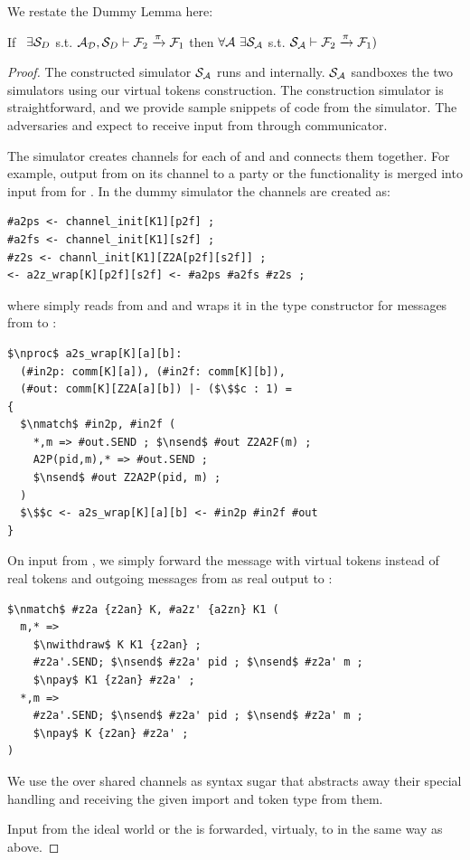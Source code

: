 We restate the Dummy Lemma here:
\begin{theorem}\label{thm:dummy}
If \ $\exists \mathcal{S}_{D}$ s.t. $ \mathcal{A}_\mathcal{D}, \mathcal{S}_{D} \vdash \mathcal{F}_2 \xrightarrow{\pi} \mathcal{F}_1$ then $\forall \mathcal{A} \ \exists \mathcal{S}_\mathcal{A}$ s.t. $\mathcal{S}_{\mathcal{A}} \vdash  \mathcal{F}_2 \xrightarrow{\pi} \mathcal{F}_1)$ 
\end{theorem}

\begin{proof}
The constructed simulator $\mathcal{S}_\mathcal{A}$ runs \A and \DS internally.
$\mathcal{S}_\mathcal{A}$ sandboxes the two simulators using our virtual tokens construction.
The construction simulator is straightforward, and we provide sample snippets of code from the simulator.
The adversaries \A and \DS expect to receive input from \Z through communicator.

The simulator creates channels for each of \A and \DS and connects them together.
For example, output from \A on its channel to a party or the functionality is merged 
into input from \Z for \DS.
In the dummy simulator the channels are created as:
\begin{lstlisting}[basicstyle=\footnotesize\BeraMonottFamily, frame=single,  mathescape]
#a2ps <- channel_init[K1][p2f] ;
#a2fs <- channel_init[K1][s2f] ;
#z2s <- channl_init[K1][Z2A[p2f][s2f]] ;
<- a2z_wrap[K][p2f][s2f] <- #a2ps #a2fs #z2s ;
\end{lstlisting}
where  simply reads from  and  and wraps it in the type constructor for messages from \Z to \A:
\begin{lstlisting}[basicstyle=\footnotesize\BeraMonottFamily, frame=single,  mathescape]
$\nproc$ a2s_wrap[K][a][b]:
  (#in2p: comm[K][a]), (#in2f: comm[K][b]), 
  (#out: comm[K][Z2A[a][b]) |- ($\$$c : 1) =
{
  $\nmatch$ #in2p, #in2f (
    *,m => #out.SEND ; $\nsend$ #out Z2A2F(m) ;
    A2P(pid,m),* => #out.SEND ; 
    $\nsend$ #out Z2A2P(pid, m) ;
  )
  $\$$c <- a2s_wrap[K][a][b] <- #in2p #in2f #out 
}
\end{lstlisting}

On input from \Z, we simply forward the message with virtual tokens instead of real tokens and outgoing messages from \A as real output to \Z:
\begin{lstlisting}[basicstyle=\footnotesize\BeraMonottFamily, frame=single,  mathescape]
$\nmatch$ #z2a {z2an} K, #a2z' {a2zn} K1 (
  m,* =>
    $\nwithdraw$ K K1 {z2an} ;
    #z2a'.SEND; $\nsend$ #z2a' pid ; $\nsend$ #z2a' m ;
    $\npay$ K1 {z2an} #z2a' ;
  *,m =>
    #z2a'.SEND; $\nsend$ #z2a' pid ; $\nsend$ #z2a' m ;
    $\npay$ K {z2an} #z2a' ;
)
\end{lstlisting}
We use the  over shared channels as syntax sugar that abstracts away their special handling and receiving the given import and token type from them. 

Input from the ideal world \F or the \partywrapper is forwarded, virtualy, to \DS in the same way as above. 
\end{proof}

